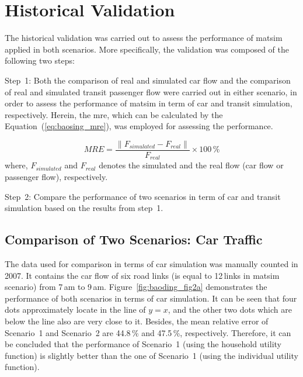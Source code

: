 \section{Historical Validation}
The historical validation was carried out to assess the performance of \gls{matsim} applied in both scenarios. 
More specifically, the validation was composed of the following two steps:

Step~1: Both the comparison of real and simulated car flow and the comparison of real and simulated transit passenger flow were carried out in either scenario, in order to assess the performance of \gls{matsim} in term of car and transit simulation, respectively. 
Herein, the \gls{mre}, which can be calculated by the Equation~(\ref{eq:baosing_mre}), was employed for assessing the performance.

\begin{equation}
\label{eq:baoding_mre}
MRE = \frac{\lVert F_{simulated} - F_{real} \lVert}{F_{real}} \times 100\,\%
\end{equation} 
where, $F_{simulated}$ and $F_{real}$ denotes the simulated and the real flow (car flow or passenger flow), respectively.

Step~2: Compare the performance of two scenarios in term of car and transit simulation based on the results from step~1. 

\subsection{Comparison of Two Scenarios: Car Traffic}
The data used for comparison in terms of car simulation was manually counted in 2007. 
It contains the car flow of six road links (is equal to 12\,links in \gls{matsim} scenario) from 7\,am to 9\,am. 
Figure~\ref{fig:baoding_fig2a} demonstrates the performance of both scenarios in terms of car simulation. 
It can be seen that four dots approximately locate in the line of $y=x$, and the other two dots which are below the line also are very close to it. 
Besides, the mean relative error of Scenario~1 and Scenario~2 are 44.8\,\% and 47.5\,\%, respectively. 
Therefore, it can be concluded that the performance of Scenario~1 (using the household utility function) is slightly better than the one of Scenario~1 (using the individual utility function). 

